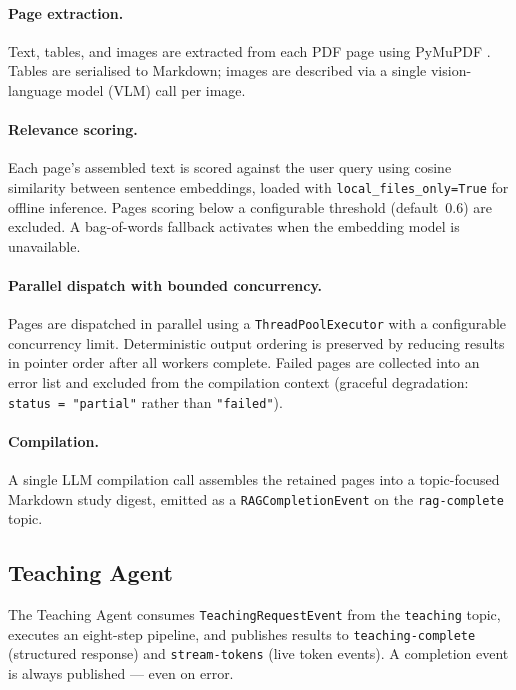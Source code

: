 \documentclass{ecai}
\begin{document}
\paragraph{Page extraction.}
Text, tables, and images are extracted from each PDF page using PyMuPDF
. Tables are serialised to Markdown; images are described
via a single vision-language model (VLM) call per image.

\paragraph{Relevance scoring.}
Each page's assembled text is scored against the user query using cosine
similarity between sentence embeddings, loaded with
\texttt{local\_files\_only=True} for offline inference. Pages scoring
below a configurable threshold (default~0.6) are excluded. A bag-of-words
fallback activates when the embedding model is unavailable.

\paragraph{Parallel dispatch with bounded concurrency.}
Pages are dispatched in parallel using a \texttt{ThreadPoolExecutor} with
a configurable concurrency limit. Deterministic output ordering is
preserved by reducing results in pointer order after all workers complete.
Failed pages are collected into an error list and excluded from the
compilation context (graceful degradation: \texttt{status~=~"partial"}
rather than \texttt{"failed"}).

\paragraph{Compilation.}
A single LLM compilation call assembles the retained pages into a
topic-focused Markdown study digest, emitted as a
\texttt{RAGCompletionEvent} on the \texttt{rag-complete} topic.



\subsection{Teaching Agent}

The Teaching Agent consumes \texttt{TeachingRequestEvent} from the \texttt{teaching} topic, executes an eight-step pipeline, and publishes results to \texttt{teaching-complete} (structured response) and \texttt{stream-tokens} (live token events). A completion event is always published — even on error.
\end{document}
